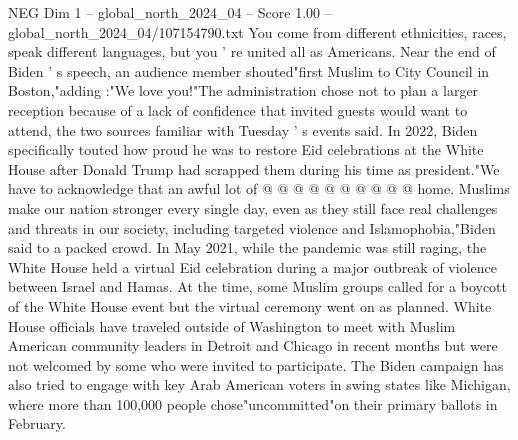 \begin{textsample}{NEG Dim 1 – global\_north\_2024\_04 – Score 1.00 – global\_north\_2024\_04/107154790.txt}
You come from different ethnicities, races, speak different languages, but you ' re united all as Americans.
Near the end of Biden ' s speech, an audience member shouted"first Muslim to City Council in Boston,"adding :"We love you!"The administration chose not to plan a larger reception because of a lack of confidence that invited guests would want to attend, the two sources familiar with Tuesday ' s events said.
In 2022, Biden specifically touted how proud he was to restore Eid celebrations at the White House after Donald Trump had scrapped them during his time as president."We have to acknowledge that an awful lot of @ @ @ @ @ @ @ @ @ @ home.
Muslims make our nation stronger every single day, even as they still face real challenges and threats in our society, including targeted violence and Islamophobia,"Biden said to a packed crowd.
In May 2021, while the pandemic was still raging, the White House held a virtual Eid celebration during a major outbreak of violence between Israel and Hamas.
At the time, some Muslim groups called for a boycott of the White House event but the virtual ceremony went on as planned.
White House officials have traveled outside of Washington to meet with Muslim American community leaders in Detroit and Chicago in recent months but were not welcomed by some who were invited to participate.
The Biden campaign has also tried to engage with key Arab American voters in swing states like Michigan, where more than 100,000 people chose"uncommitted"on their primary ballots in February.

\end{textsample}
